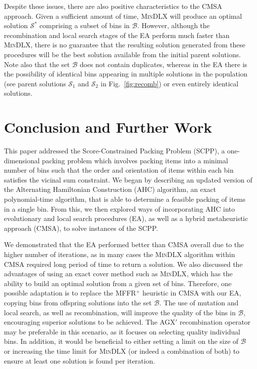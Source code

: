 \documentclass{IEEEtran}
\begin{document}
Despite these issues, there are also positive characteristics to the CMSA approach. Given a sufficient amount of time, \textsc{MinDLX} will produce an optimal solution $\mathcal{S}^*$ comprising a subset of bins in $\mathcal{B}$. However, although the recombination and local search stages of the EA perform much faster than \textsc{MinDLX}, there is no guarantee that the resulting solution generated from these procedures will be the best solution available from the initial parent solutions. Note also that the set $\mathcal{B}$ does not contain duplicates, whereas in the EA there is the possibility of identical bins appearing in multiple solutions in the population (see parent solutions $\mathcal{S}_1$ and $\mathcal{S}_2$ in Fig.~\ref{fig:recomb}) or even entirely identical solutions.



\section{Conclusion and Further Work}
\label{sec:conclusion}
This paper addressed the Score-Constrained Packing Problem (SCPP), a one-dimensional packing problem which involves packing items into a minimal number of bins such that the order and orientation of items within each bin satisfies the vicinal sum constraint. We began by describing an updated version of the Alternating Hamiltonian Construction (AHC) algorithm, an exact polynomial-time algorithm, that is able to determine a feasible packing of items in a single bin. From this, we then explored ways of incorporating AHC into evolutionary and local search procedures (EA), as well as a hybrid metaheuristic approach (CMSA), to solve instances of the SCPP.

We demonstrated that the EA performed better than CMSA overall due to the higher number of iterations, as in many cases the \textsc{MinDLX} algorithm within CMSA required long period of time to return a solution. We also discussed the advantages of using an exact cover method such as \textsc{MinDLX}, which has the ability to build an optimal solution from a given set of bins. Therefore, one possible adaptation is to replace the MFFR$^+$ heuristic in CMSA with our EA, copying bins from offspring solutions into the set $\mathcal{B}$. The use of mutation and local search, as well as recombination, will improve the quality of the bins in $\mathcal{B}$, encouraging superior solutions to be achieved. The AGX$'$ recombination operator may be preferable in this scenario, as it focuses on selecting quality individual bins. In addition, it would be beneficial to either setting a limit on the size of $\mathcal{B}$ or increasing the time limit for \textsc{MinDLX} (or indeed a combination of both) to ensure at least one solution is found per iteration.
\end{document}
